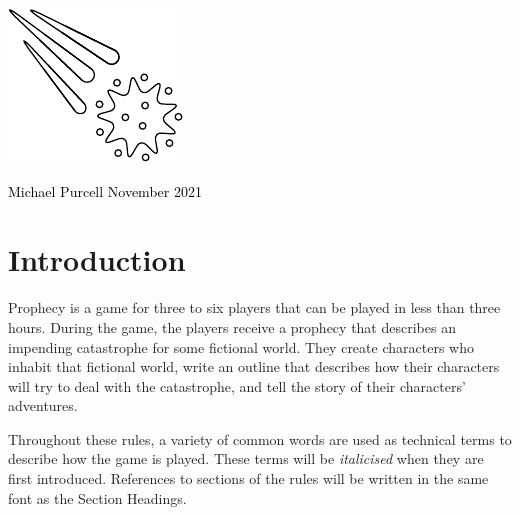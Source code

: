 \documentclass[12pt, a5paper, parskip=half-]{scrartcl}
\begin{document}

\begin{titlepage}
		\enlargethispage{5\baselineskip} %

         \setmainfont{Cinzel Decorative}
	    \centering{
			{\fontsize{60}{72}\selectfont
			{\textcolor{black}{pROpHecY}}}
		}

		\setmainfont{URWClassico}
		\vspace{10mm}
		\centering{\Large{{\textcolor{black}{A tabletop roleplaying game\\ \smallskip about fate and destiny}}}}

		\vfill

		\includegraphics[scale=3.85]{Images/comet_diagram.pdf}

		\vfill
		
		\raggedright{\Large{{\textcolor{black}{Michael Purcell \hfill November 2021}}}}

\end{titlepage}


\setmainfont{URWClassico}
\normalsize
\raggedright
\section*{Introduction}
Prophecy is a game for three to six players that can be played in less than three hours.
During the game, the players receive a prophecy that describes an impending catastrophe for some fictional world.
They create characters who inhabit that fictional world, write an outline that describes how their characters will try to deal with the catastrophe, and tell the story of their characters' adventures.

Throughout these rules, a variety of common words are used as technical terms to describe how the game is played.
These terms will be \emph{italicised} when they are first introduced.
References to sections of the rules will be written in the same font as the {\cinzel \small Section Headings}.
\end{document}
